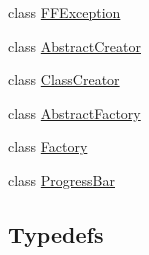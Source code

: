 \begin{DoxyCompactItemize}
\item 
class \hyperlink{classffactory_1_1_f_f_exception}{F\-F\-Exception}
\item 
class \hyperlink{classffactory_1_1_abstract_creator}{Abstract\-Creator}
\item 
class \hyperlink{classffactory_1_1_class_creator}{Class\-Creator}
\item 
class \hyperlink{classffactory_1_1_abstract_factory}{Abstract\-Factory}
\item 
class \hyperlink{classffactory_1_1_factory}{Factory}
\item 
class \hyperlink{classffactory_1_1_progress_bar}{Progress\-Bar}
\end{DoxyCompactItemize}
\subsection*{Typedefs}
